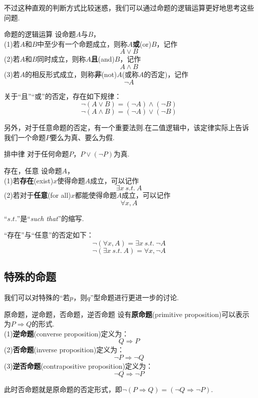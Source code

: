 \documentclass[lang=cn, zihao=5]{elegantbook}
\begin{document}
不过这种直观的判断方式比较迷惑，我们可以通过命题的逻辑运算更好地思考这些问题.

\begin{definition}{命题的逻辑运算} %
	设命题$A$与$B$， \\
	(1)若$A$和$B$中至少有一个命题成立，则称$A$\textbf{或}(or)$B$，记作$$A \vee B$$
	(2)若$A$和$B$同时成立，则称$A$\textbf{且}(and)$B$，记作$$A \wedge B$$
	(3)若$A$的相反形式成立，则称\textbf{非}(not)$A$(或称$A$的否定)，记作$$\neg A$$
\end{definition}
\begin{remark}
	关于“且”“或”的否定，存在如下规律：
	$$\neg (A \vee B) = (\neg A) \wedge (\neg B)$$
	$$\neg (A \wedge B) = (\neg A) \vee (\neg B)$$
\end{remark}

另外，对于任意命题的否定，有一个重要法则.在二值逻辑中，该定律实际上告诉我们一个命题$P$要么为真、要么为假.

\begin{proposition}{排中律}
	对于任何命题$P$，$P \vee (\neg P)$为真.
\end{proposition}

\begin{definition}{存在，任意}
	设命题$A$， \\
	(1)若\textbf{存在}(exist)$x$使得命题$A$成立，可以记作$$\exists x~s.t.~A$$
	(2)若对于\textbf{任意}(for all)$x$都能使得命题$A$成立，可以记作$$\forall x,A$$
\end{definition}
\begin{remark}
	“$s.t.$”是“\textit{such that}”的缩写.
\end{remark}
\begin{remark}
	“存在”与“任意”的否定如下：
	$$\neg (\forall x,A) = \exists x~s.t.~\neg A$$
	$$\neg (\exists x~s.t.~A) = \forall x,\neg A$$
\end{remark}

\subsection{特殊的命题}

我们可以对特殊的“若$p$，则$q$”型命题进行更进一步的讨论.

\begin{definition}{原命题，逆命题，否命题，逆否命题}
	设有\textbf{原命题}(primitive proposition)可以表示为$P \Rightarrow Q$的形式. \\
	(1)\textbf{逆命题}(converse proposition)定义为：$$Q \Rightarrow P$$
	(2)\textbf{否命题}(inverse proposition)定义为：$$\neg P \Rightarrow \neg Q$$
	(3)\textbf{逆否命题}(contrapositive proposition)定义为：$$\neg Q \Rightarrow \neg P$$
\end{definition}
\begin{remark}
	此时否命题就是原命题的否定形式，即$\neg (P \Rightarrow Q) = (\neg Q \Rightarrow \neg P)$.
\end{remark}
\end{document}
